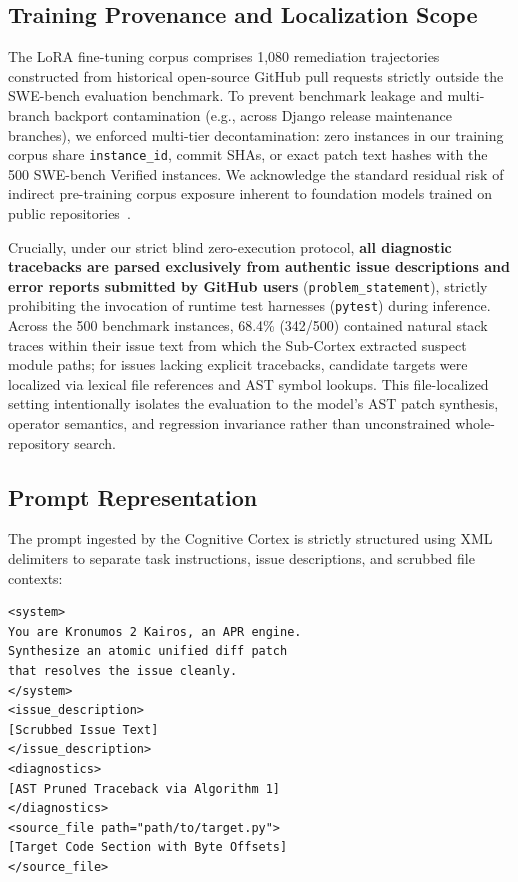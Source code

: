 \documentclass[10pt,twocolumn,letterpaper]{article}
\begin{document}
\subsection{Training Provenance and Localization Scope}
The LoRA fine-tuning corpus comprises 1,080 remediation trajectories constructed from historical open-source GitHub pull requests strictly outside the SWE-bench evaluation benchmark. To prevent benchmark leakage and multi-branch backport contamination (e.g., across Django release maintenance branches), we enforced multi-tier decontamination: zero instances in our training corpus share \texttt{instance\_id}, commit SHAs, or exact patch text hashes with the 500 SWE-bench Verified instances. We acknowledge the standard residual risk of indirect pre-training corpus exposure inherent to foundation models trained on public repositories~\cite{hui2024qwen25coder}.

Crucially, under our strict blind zero-execution protocol, \textbf{all diagnostic tracebacks are parsed exclusively from authentic issue descriptions and error reports submitted by GitHub users} (\texttt{problem\_statement}), strictly prohibiting the invocation of runtime test harnesses (\texttt{pytest}) during inference. Across the 500 benchmark instances, 68.4\% (342/500) contained natural stack traces within their issue text from which the Sub-Cortex extracted suspect module paths; for issues lacking explicit tracebacks, candidate targets were localized via lexical file references and AST symbol lookups. This file-localized setting intentionally isolates the evaluation to the model's AST patch synthesis, operator semantics, and regression invariance rather than unconstrained whole-repository search.

\subsection{Prompt Representation}
The prompt ingested by the Cognitive Cortex is strictly structured using XML delimiters to separate task instructions, issue descriptions, and scrubbed file contexts:
\begin{lstlisting}
<system>
You are Kronumos 2 Kairos, an APR engine.
Synthesize an atomic unified diff patch
that resolves the issue cleanly.
</system>
<issue_description>
[Scrubbed Issue Text]
</issue_description>
<diagnostics>
[AST Pruned Traceback via Algorithm 1]
</diagnostics>
<source_file path="path/to/target.py">
[Target Code Section with Byte Offsets]
</source_file>
\end{lstlisting}
\end{document}
